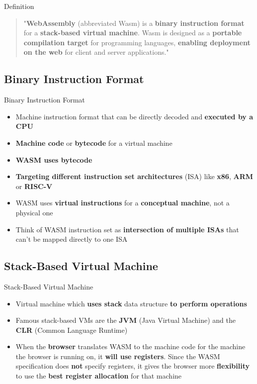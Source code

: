 \documentclass{beamer}
\begin{document}
\begin{frame}{Definition}
    \begin{quotation}
        "\textbf{WebAssembly} (abbreviated Wasm) is a \textbf{binary instruction format} for a \textbf{stack-based virtual machine}. Wasm is designed as a \textbf{portable compilation target} for programming languages, \textbf{enabling deployment on the web} for client and server applications."
    \end{quotation}
\end{frame}

\subsection{Binary Instruction Format}

\begin{frame}{Binary Instruction Format}
    \begin{itemize}
        \item Machine instruction format that can be directly decoded and \textbf{executed by a CPU}
        \item \textbf{Machine code} or \textbf{bytecode} for a virtual machine 
        \item \textbf{WASM uses bytecode}
        \item \textbf{Targeting different instruction set architectures} (ISA) like \textbf{x86}, \textbf{ARM} or \textbf{RISC-V}
        \item WASM uses \textbf{virtual instructions} for a \textbf{conceptual machine}, not a physical one
        \item Think of WASM instruction set as \textbf{intersection of multiple ISAs} that can't be mapped directly to one ISA
    \end{itemize}
\end{frame}

\subsection{Stack-Based Virtual Machine}

\begin{frame}{Stack-Based Virtual Machine}
    \begin{itemize}
        \item Virtual machine which \textbf{uses stack} data structure \textbf{to perform operations}
        \item Famous stack-based VMs are the \textbf{JVM} (Java Virtual Machine) and the \textbf{CLR} (Common Language Runtime)
        \item When the \textbf{browser} translates WASM to the machine code for the machine the browser is running on, it \textbf{will use registers}. Since the WASM specification does \textbf{not} specify registers, it gives the browser more \textbf{flexibility} to use the \textbf{best register allocation} for  that machine
    \end{itemize}
\end{frame}
\end{document}
